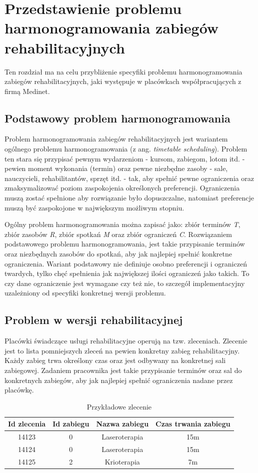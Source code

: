 \chapter{Przedstawienie problemu harmonogramowania zabiegów rehabilitacyjnych}
Ten rozdział ma na celu przybliżenie specyfiki problemu harmonogramowania zabiegów
rehabilitacyjnych, jaki występuje w placówkach współpracujących z firmą Medinet.

\section{Podstawowy problem harmonogramowania}
Problem harmonogramowania zabiegów rehabilitacyjnych jest wariantem ogólnego problemu
harmonogramowania (z ang. \emph{timetable scheduling}). Problem ten  stara się
przypisać pewnym wydarzeniom - kursom, zabiegom, lotom itd. - pewien moment
wykonania (termin) oraz pewne niezbędne zasoby - sale, nauczycieli,
rehabilitantów, sprzęt itd. - tak, aby spełnić pewne ograniczenia oraz
zmaksymalizować poziom zaspokojenia określonych preferencji. Ograniczenia muszą
zostać spełnione aby rozwiązanie było dopuszczalne, natomiast preferencje muszą
być zaspokojone w największym możliwym stopniu.

Ogólny problem harmonogramowania można zapisać \cite{habib2013} jako:
zbiór terminów \emph{T}, zbiór zasobów \emph{R}, zbiór spotkań \emph{M} oraz
zbiór ograniczeń \emph{C}. Rozwiązaniem podstawowego problemu harmonogramowania,
jest takie przypisanie terminów oraz niezbędnych zasobów do spotkań, aby jak
najlepiej spełnić konkretne ograniczenia. Wariant podstawowy nie definiuje
osobno preferencji i ograniczeń twardych, tylko chęć spełnienia jak największej ilości ograniczeń
jako takich. To czy dane ograniczenie jest wymagane czy też nie, to szczegół
implementacyjny uzależniony od specyfiki konkretnej wersji problemu.
\newpage
\section{Problem w wersji rehabilitacyjnej}
\label{problem-desc}
Placówki świadczące usługi rehabilitacyjne operują na tzw. zleceniach. Zlecenie
jest to lista pomniejszych zleceń na pewien konkretny zabieg rehabilitacyjny.
Każdy zabieg trwa określony czas oraz jest odbywany na konkretnej sali
zabiegowej. Zadaniem pracownika jest takie przypisanie terminów oraz sal do konkretnych
zabiegów, aby jak najlepiej spełnić ograniczenia nadane przez placówkę.

\begin{table}[h]
	\centering
	\begin{tabular}{ | c | c | c | c | }
		\hline
	\bfseries Id zlecenia & \bfseries Id zabiegu & \bfseries Nazwa zabiegu & \bfseries Czas trwania zabiegu \\
	\hline
	14123 & 0 & Laseroterapia & 15m \\
		\hline
	14124 & 0 & Laseroterapia & 15m \\
		\hline
	14125 & 2 & Krioterapia & 7m \\
		\hline
	\end{tabular}
	\caption{Przykładowe zlecenie}
	\label{example-referral}
\end{table}

